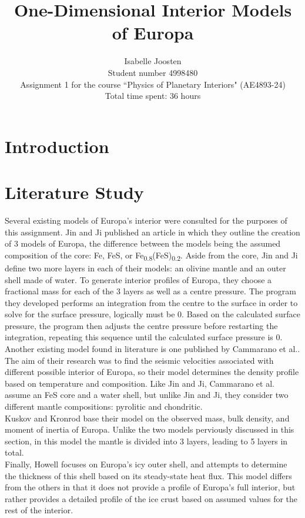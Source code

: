 \documentclass[twocolumn]{article}
\title{One-Dimensional Interior Models of Europa}
\author{Isabelle Joosten\\Student number 4998480\\Assignment 1 for the course ``Physics of Planetary Interiors" (AE4893-24)\\Total time spent: 36 hours}
\begin{document}
\maketitle

\section{Introduction}

\section{Literature Study}
Several existing models of Europa's interior were consulted for the purposes of this assignment. Jin and Ji\cite{jinInternalStructureModels2012} published an article in which they outline the creation of 3 models of Europa, the difference between the models being the assumed composition of the core: Fe, FeS, or Fe\textsubscript{0.8}(FeS)\textsubscript{0.2}. Aside from the core, Jin and Ji define two more layers in each of their models: an olivine mantle and an outer shell made of water. To generate interior profiles of Europa, they choose a fractional mass for each of the 3 layers as well as a centre pressure. The program they developed performs an integration from the centre to the surface in order to solve for the surface pressure, logically must be 0. Based on the calculated surface pressure, the program then adjusts the centre pressure before restarting the integration, repeating this sequence until the calculated surface pressure is 0.\\
Another existing model found in literature is one published by Cammarano et al.\cite{cammaranoLongperiodSeismologyEuropa2006}. The aim of their research was to find the seismic velocities associated with different possible interior of Europa, so their model determines the density profile based on temperature and composition. Like Jin and Ji, Cammarano et al. assume an FeS core and a water shell, but unlike Jin and Ji, they consider two different mantle compositions: pyrolitic and chondritic.\\
Kuskov and Kronrod\cite{kuskovInternalStructureEuropa2005} base their model on the observed mass, bulk density, and moment of inertia of Europa. Unlike the two models perviously discussed in this section, in this model the mantle is divided into 3 layers, leading to 5 layers in total.\\
Finally, Howell\cite{howellLikelyThicknessEuropas2021} focuses on Europa's icy outer shell, and attempts to determine the thickness of this shell based on its steady-state heat flux. This model differs from the others in that it does not provide a profile of Europa's full interior, but rather provides a detailed profile of the ice crust based on assumed values for the rest of the interior.\\
\end{document}
